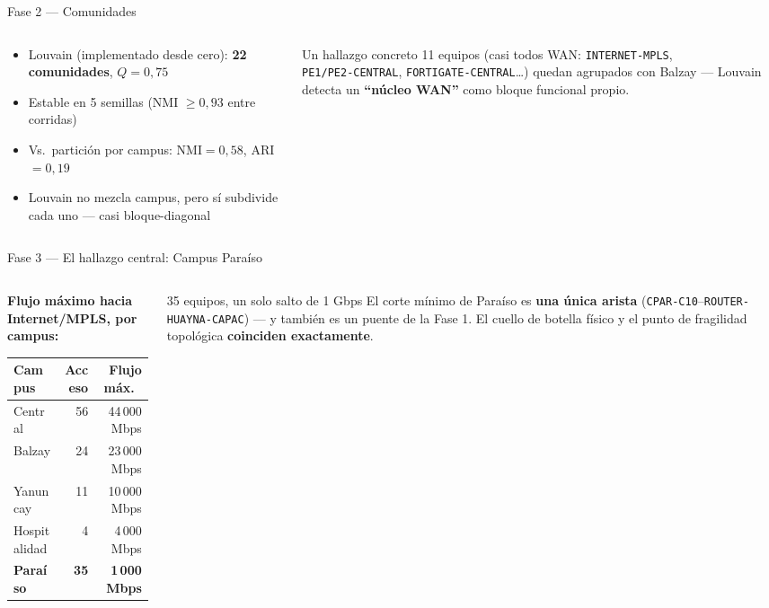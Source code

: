 \documentclass[11pt,aspectratio=169]{beamer}
\begin{document}
\begin{frame}{Fase 2 --- Comunidades}
\begin{columns}[T]
\begin{column}{0.55\textwidth}
\begin{itemize}
  \item Louvain (implementado desde cero): \textbf{22 comunidades}, $Q=0{,}75$
  \item Estable en 5 semillas (NMI $\geq0{,}93$ entre corridas)
  \item Vs.\ partición por campus: NMI$=0{,}58$, ARI$=0{,}19$
  \item Louvain no mezcla campus, pero sí subdivide cada uno --- casi bloque-diagonal
\end{itemize}
\end{column}
\begin{column}{0.45\textwidth}
\begin{block}{Un hallazgo concreto}
11 equipos (casi todos WAN: \texttt{INTERNET-MPLS},\\ \texttt{PE1/PE2-CENTRAL}, \texttt{FORTIGATE-CENTRAL}\ldots) quedan agrupados con Balzay --- Louvain detecta un \textbf{``núcleo WAN''} como bloque funcional propio.
\end{block}
\end{column}
\end{columns}
\end{frame}

\begin{frame}{Fase 3 --- El hallazgo central: Campus Paraíso}
\begin{columns}[T]
\begin{column}{0.55\textwidth}
\textbf{Flujo máximo hacia Internet/MPLS, por campus:}
\begin{table}
\small
\begin{tabular}{lrr}
\toprule
Campus & Acceso & Flujo máx.\ \\
\midrule
Central & 56 & 44\,000 Mbps \\
Balzay & 24 & 23\,000 Mbps \\
Yanuncay & 11 & 10\,000 Mbps \\
Hospitalidad & 4 & 4\,000 Mbps \\
\textbf{Paraíso} & \textbf{35} & \textbf{1\,000 Mbps} \\
\bottomrule
\end{tabular}
\end{table}
\end{column}
\begin{column}{0.45\textwidth}
\begin{block}{35 equipos, un solo salto de 1 Gbps}
El corte mínimo de Paraíso es \textbf{una única arista}
(\texttt{CPAR-C10}--\texttt{ROUTER-HUAYNA-CAPAC}) --- y también es un puente
de la Fase 1. El cuello de botella físico y el punto de fragilidad
topológica \textbf{coinciden exactamente}.
\end{block}
\end{column}
\end{columns}
\end{frame}
\end{document}
